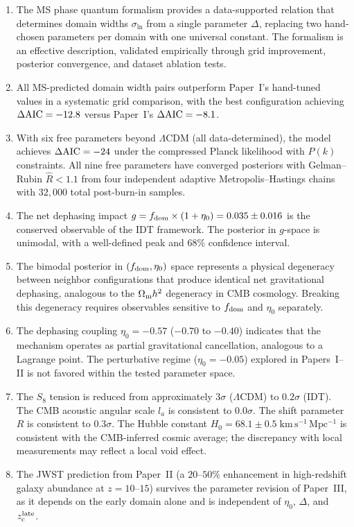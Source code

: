 \documentclass[aps,prd,twocolumn,superscriptaddress,nofootinbib]{revtex4-2}
\newcommand{\Om}{\Omega_{\rm m}}
\newcommand{\fdom}{f_{\rm dom}}
\newcommand{\zc}{z_{\rm c}}
\newcommand{\sln}{\sigma_{\ln}}
\newcommand{\Hubble}{H_0}
\newcommand{\dAIC}{\Delta{\rm AIC}}
\newcommand{\etaz}{\eta_0}
\newcommand{\Rhat}{\hat{R}}
\begin{document}
\begin{enumerate}
\item The MS phase quantum formalism provides a data-supported
  relation that determines domain widths $\sln$ from a single
  parameter $\Delta$, replacing two hand-chosen parameters per domain
  with one universal constant. The formalism is an effective
  description, validated empirically through grid improvement,
  posterior convergence, and dataset ablation tests.

\item All MS-predicted domain width pairs outperform Paper~I's
  hand-tuned values in a systematic grid comparison, with the best
  configuration achieving $\dAIC = -12.8$ versus Paper~I's
  $\dAIC = -8.1$.

\item With six free parameters beyond $\Lambda$CDM (all
  data-determined), the model achieves $\dAIC = -24$ under the
  compressed Planck likelihood with $P(k)$ constraints. All nine free
  parameters have converged posteriors with Gelman--Rubin
  $\Rhat < 1.1$ from four independent adaptive Metropolis--Hastings
  chains with $32{,}000$ total post-burn-in samples.

\item The net dephasing impact $g = \fdom \times (1 + \etaz) = 0.035
  \pm 0.016$ is the conserved observable of the IDT framework. The
  posterior in $g$-space is unimodal, with a well-defined peak and
  $68\%$ confidence interval.

\item The bimodal posterior in $(\fdom, \etaz)$ space represents a
  physical degeneracy between neighbor configurations that produce
  identical net gravitational dephasing, analogous to the $\Om h^2$
  degeneracy in CMB cosmology. Breaking this degeneracy requires
  observables sensitive to $\fdom$ and $\etaz$ separately.

\item The dephasing coupling $\etaz = -0.57$ ($-0.70$ to $-0.40$)
  indicates that the mechanism operates as partial gravitational
  cancellation, analogous to a Lagrange point. The perturbative
  regime ($\etaz = -0.05$) explored in Papers~I--II is not favored
  within the tested parameter space.

\item The $S_8$ tension is reduced from approximately $3\sigma$
  ($\Lambda$CDM) to $0.2\sigma$ (IDT). The CMB acoustic angular
  scale $l_a$ is consistent to $0.0\sigma$. The shift parameter $R$
  is consistent to $0.3\sigma$. The Hubble constant
  $\Hubble = 68.1 \pm 0.5\;\mathrm{km\,s^{-1}\,Mpc^{-1}}$ is
  consistent with the CMB-inferred cosmic average; the discrepancy
  with local measurements may reflect a local void effect.

\item The JWST prediction from Paper~II (a $20$--$50\%$ enhancement
  in high-redshift galaxy abundance at $z = 10$--$15$) survives the
  parameter revision of Paper~III, as it depends on the early domain
  alone and is independent of $\etaz$, $\Delta$, and $\zc^{\rm late}$.
\end{enumerate}
\end{document}
